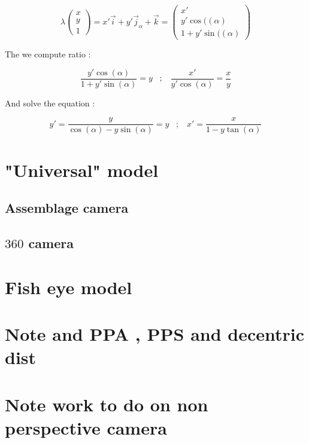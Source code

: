 \begin{equation}
        \lambda \begin{pmatrix} x \\ y  \\ 1  \end{pmatrix}
      = x'  \vec{i} + y' \vec{j}_\alpha  + \vec{k}
      =	\begin{pmatrix} x' \\ y'\cos((\alpha)  \\ 1+y'\sin((\alpha)  \end{pmatrix}
\end{equation}


The we compute ratio :

\begin{equation}
	\frac{y'\cos(\alpha)}{1+y'\sin(\alpha)} =  y \;\;\; ; \;\;\;  
	\frac{x'}{y'\cos(\alpha)} =  \frac{x}{y} 
\end{equation}

And solve the equation :

\begin{equation}
	y' = \frac{y}{\cos(\alpha) -y \sin(\alpha)} =  y \;\;\; ; \;\;\;
	x' = \frac{x}{1-y \tan(\alpha)}
\end{equation}




\section{"Universal" model}

\subsection{Assemblage camera}
\subsection{$360$ camera}

\section{Fish eye model}
\label{SecFE}

\section{Note and PPA , PPS and decentric dist}
\label{PPA:PPS:DEC}


\section{Note work to do on non perspective camera}








